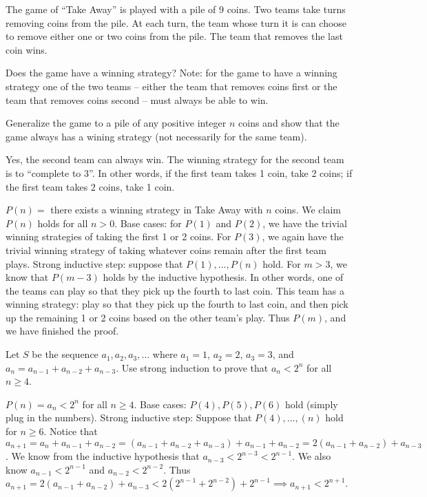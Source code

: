 \documentclass[solution, letterpaper]{cs20}
\begin{document}
        \problem{}{}

        The game of ``Take Away'' is played with a pile of 9 coins. Two teams take turns removing coins from the pile. At each turn, the team whose turn it is can choose to remove either one or two coins from the pile. The team that removes the last coin wins.

        \subproblem Does the game have a winning strategy? Note: for the game to have a winning strategy one of the two teams -- either the team that removes coins first or the team that removes coins second -- must always be able to win.

        \subproblem Generalize the game to a pile of any positive integer $n$ coins and show that the game always has a wining strategy (not necessarily for the same team).

        \begin{solution}

        \subsolution Yes, the second team can always win. The winning strategy for the second team is to ``complete to 3''. In other words, if the first team takes 1 coin, take 2 coins; if the first team takes 2 coins, take 1 coin.

        \subsolution $P(n) = $ there exists a winning strategy in Take Away with $n$ coins. We claim $P(n)$ holds for all $n > 0$. Base cases: for $P(1)$ and $P(2)$, we have the trivial winning strategies of taking the first 1 or 2 coins. For $P(3)$, we again have the trivial winning strategy of taking whatever coins remain after the first team plays. Strong inductive step: suppose that $P(1), ..., P(n)$ hold. For $m > 3$, we know that $P(m-3)$ holds by the inductive hypothesis. In other words, one of the teams can play so that they pick up the fourth to last coin. This team has a winning strategy: play so that they pick up the fourth to last coin, and then pick up the remaining 1 or 2 coins based on the other team's play. Thus $P(m)$, and we have finished the proof.

        \end{solution}

        \problem{}{}

        Let $S$ be the sequence $a_1, a_2, a_3, \ldots$ where $a_1 = 1$, $a_2 = 2$, $a_3 = 3$, and $a_n = a_{n-1} + a_{n-2} + a_{n-3}$. Use strong induction to prove that $a_n < 2^n$ for all $n \geq 4$.

        \begin{solution}

        $P(n) = a_n < 2^n$ for all $n \geq 4$. Base cases: $P(4), P(5), P(6)$ hold (simply plug in the numbers). Strong inductive step: Suppose that $P(4), ..., (n)$ hold for $n \geq 6$. Notice that $a_{n+1} = a_n + a_{n-1} + a_{n-2} = (a_{n-1} + a_{n-2} + a_{n-3}) + a_{n-1} + a_{n-2} = 2(a_{n-1}+a_{n-2}) + a_{n-3}$. We know from the inductive hypothesis that $a_{n-3} < 2^{n-3} < 2^{n-1}$. We also know $a_{n-1} < 2^{n-1}$ and $a_{n-2} < 2^{n-2}$. Thus $a_{n+1} =  2(a_{n-1}+a_{n-2}) + a_{n-3} < 2(2^{n-1} + 2^{n-2}) + 2^{n-1} \implies a_{n+1} <2^{n+1}$.

        \end{solution}
\end{document}
